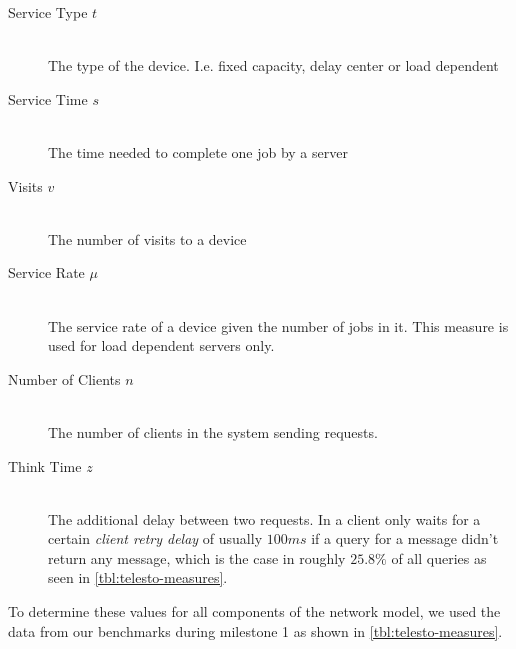 \documentclass[a4paper, oneside]{csthesis}
\begin{document}
    \begin{description}
        \item[Service Type $t$] \ \\
            The type of the device. I.e. fixed capacity, delay center or load
            dependent
        \item[Service Time $s$] \ \\
            The time needed to complete one job by a server
        \item[Visits $v$] \ \\
            The number of visits to a device
        \item[Service Rate $\mu$] \ \\
            The service rate of a device given the number of jobs in it.
            This measure is used for load dependent servers only.
        \item[Number of Clients $n$] \ \\
            The number of clients in the system sending requests.
        \item[Think Time $z$] \ \\
            The additional delay between two requests. In \telesto{} a client
            only waits for a certain {\it client retry delay} of usually $100
            ms$ if a query for a message didn't return any message, which is
            the case in roughly $25.8 \%$ of all queries as seen in
            \cref{tbl:telesto-measures}.
    \end{description}


    To determine these values for all components of the network model, we used
    the data from our benchmarks during milestone 1 as shown in
    \cref{tbl:telesto-measures}.


    \begin{table}[ht]
        \centering
        
        \begin{adjustbox}{center}
        \end{adjustbox}
        \caption{Important measurement data of \telesto{}}
        \label{tbl:telesto-measures}
    \end{table}
\end{document}
